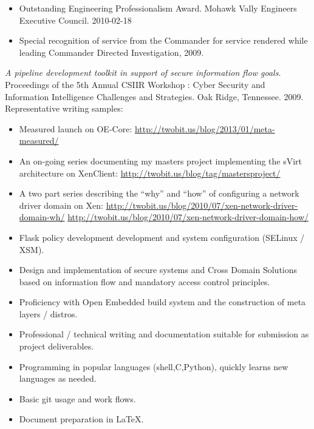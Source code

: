 \documentclass[letterpaper,11pt]{article}
\begin{document}
    \begin {itemize}
      \setlength {\itemsep}{1pt}
      \setlength {\parskip}{0pt}
      \setlength {\parsep}{0pt}
    \item Outstanding Engineering Professionalism Award.
      Mohawk Vally Engineers Executive Council.
      2010-02-18
    \item Special recognition of service from the Commander for service rendered while leading Commander Directed Investigation, 2009.
    \end {itemize}

    {\it A pipeline development toolkit in support of secure information flow goals}.
    Proceedings of the 5th Annual CSIIR Workshop : Cyber Security and Information Intelligence Challenges and Strategies.
    Oak Ridge, Tennessee.
    2009.\\
    Representative writing samples:
    \begin {itemize}
      \setlength {\itemsep}{1pt}
      \setlength {\parskip}{0pt}
      \setlength {\parsep}{0pt}
    \item
      Measured launch on OE-Core:
      \url {http://twobit.us/blog/2013/01/meta-measured/}
    \item
      An on-going series documenting my masters project implementing the sVirt architecture on XenClient:
      \url {http://twobit.us/blog/tag/mastersproject/}
    \item
      A two part series describing the ``why'' and ``how'' of configuring a network driver domain on Xen:
      \url {http://twobit.us/blog/2010/07/xen-network-driver-domain-wh/}
      \url {http://twobit.us/blog/2010/07/xen-network-driver-domain-how/}
    \end {itemize}
    \begin {itemize}
      \setlength {\itemsep}{1pt}
      \setlength {\parskip}{0pt}
      \setlength {\parsep}{0pt}
      \item Flask policy development development and system configuration (SELinux / XSM).
      \item Design and implementation of secure systems and Cross Domain Solutions based on information flow and mandatory access control principles.
      \item Proficiency with Open Embedded build system and the construction of meta layers / distros.
      \item Professional / technical writing and documentation suitable for submission as project deliverables.
      \item Programming in popular languages (shell,C,Python), quickly learns new languages as needed.
      \item Basic git usage and work flows.
      \item Document preparation in \LaTeX.
    \end {itemize}
\end{document}
